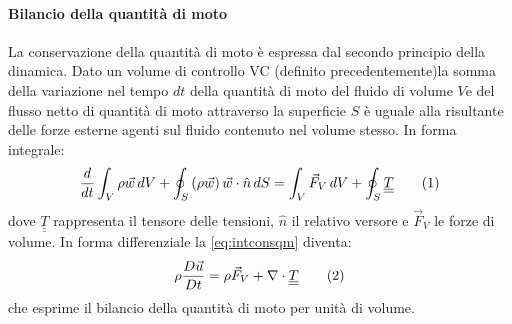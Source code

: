 \paragraph{Bilancio della quantità di moto}
La conservazione della quantità di moto è espressa dal secondo principio della dinamica. Dato un volume di controllo VC (definito precedentemente)la somma della variazione nel tempo \(dt\) della quantità di moto del fluido di volume \(V\)e del flusso netto di quantità di moto attraverso la superficie \(S\) è uguale alla risultante delle forze esterne agenti sul fluido contenuto nel volume stesso.
In forma integrale:
\[\frac{d}{dt} \int_V \rho \vec w \, dV + \oint_S \left( \rho \vec w \right) \vec w \cdot \hat n \, dS = \int_V \vec F_V \, dV + \oint_S \underline{\underline T } \addtag \label{eq:intconsqm} \]
dove \(\underline{\underline T }\) rappresenta il tensore delle tensioni, \(\hat n\) il relativo versore e \(\vec F_V\) le forze di volume. In forma differenziale la \eqref{eq:intconsqm} diventa:
\[\rho \frac{D \vec u}{Dt} = \rho \vec F_V + \nabla \cdot \underline{\underline T } \addtag \]
che esprime il bilancio della quantità di moto per unità di volume.


